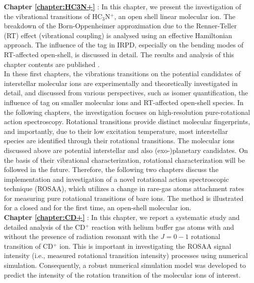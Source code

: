 \textbf{Chapter \ref{chapter:HC3N+}} \emph{}: In this chapter, we present the investigation of the vibrational transitions of HC$_3$N$^+$, an open shell linear molecular ion. The breakdown of the Born-Oppenheimer approximation due to the Renner-Teller (RT) effect (vibrational coupling) is analysed using an effective Hamiltonian approach. The influence of the tag in IRPD, especially on the bending modes of RT-affected open-shell, is discussed in detail. The results and analysis of this chapter contents are published \cite{steenbakkers_vibrational_2023}.\\

In these first chapters, the vibrations transitions on the potential candidates of interstellar molecular ions are 
experimentally and theoretically investigated in detail, and discussed from various perspectives, such as isomer 
quantification, the influence of tag on smaller molecular ions and RT-affected open-shell species. In the following 
chapters, the investigation focuses on high-resolution pure-rotational action spectroscopy. Rotational transitions 
provide distinct molecular fingerprints, and importantly, due to their low excitation temperature, most interstellar 
species are identified through their rotational transitions. The molecular ions discussed above are potential 
interstellar and also (exo-)planetary candidates. On the basis of their vibrational characterization, rotational 
characterization will be followed in the future. Therefore, the following two chapters discuss the implementation and 
investigation of a novel rotational action spectroscopic technique (ROSAA), which utilizes a change in rare-gas atoms 
attachment rates for measuring pure rotational transitions of bare ions. The method is illustrated for a closed and for 
the first time, an open-shell molecular ion. \\

\textbf{Chapter \ref{chapter:CD+}} \emph{}: In this chapter, we report a systematic study and detailed analysis of the CD$^+$ reaction with helium buffer gas atoms with and without the presence of radiation resonant with the $J=0-1$ rotational transition of CD$^+$ ion. This is important in investigating the ROSAA signal intensity (i.e., measured rotational transition intensity) processes using numerical simulation. Consequently, a robust numerical simulation model was developed to predict the intensity of the rotation transition of the molecular ions of interest.\\


